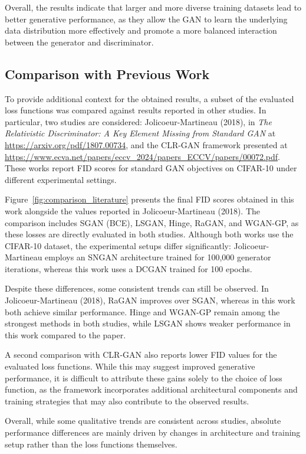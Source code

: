 \documentclass[conference]{IEEEtran}
\begin{document}
Overall, the results indicate that larger and more diverse training datasets lead to better generative performance, as they allow the GAN to learn the underlying data distribution more effectively and promote a more balanced interaction between the generator and discriminator.



\subsection{Comparison with Previous Work}

To provide additional context for the obtained results, a subset of the evaluated loss functions was compared against results reported in other studies. In particular, two studies are considered: Jolicoeur-Martineau (2018), in \textit{The Relativistic Discriminator: A Key Element Missing from Standard GAN} at \url{https://arxiv.org/pdf/1807.00734}, and the CLR-GAN framework presented at \url{https://www.ecva.net/papers/eccv_2024/papers_ECCV/papers/00072.pdf}. These works report FID scores for standard GAN objectives on CIFAR-10 under different experimental settings.

Figure~\ref{fig:comparison_literature} presents the final FID scores obtained in this work alongside the values reported in Jolicoeur-Martineau (2018). The comparison includes SGAN (BCE), LSGAN, Hinge, RaGAN, and WGAN-GP, as these losses are directly evaluated in both studies. Although both works use the CIFAR-10 dataset, the experimental setups differ significantly: Jolicoeur-Martineau employs an SNGAN architecture trained for 100,000 generator iterations, whereas this work uses a DCGAN trained for 100 epochs.

Despite these differences, some consistent trends can still be observed. In Jolicoeur-Martineau (2018), RaGAN improves over SGAN, whereas in this work both achieve similar performance. Hinge and WGAN-GP remain among the strongest methods in both studies, while LSGAN shows weaker performance in this work compared to the paper.

A second comparison with CLR-GAN also reports lower FID values for the evaluated loss functions. While this may suggest improved generative performance, it is difficult to attribute these gains solely to the choice of loss function, as the framework incorporates additional architectural components and training strategies that may also contribute to the observed results.

Overall, while some qualitative trends are consistent across studies, absolute performance differences are mainly driven by changes in architecture and training setup rather than the loss functions themselves.
\end{document}
